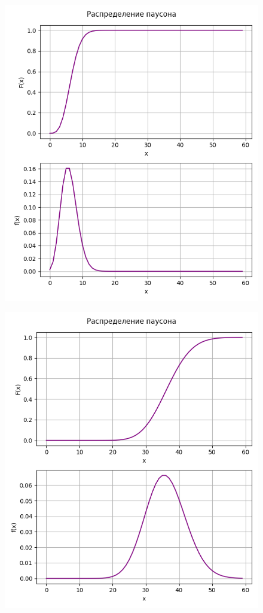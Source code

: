 \begin{figure}[H]
	\centering
	\includegraphics[width=0.7\linewidth]{src/3}
	\caption{}
	\label{fig:3}
\end{figure}

\begin{figure}[H]
	\centering
	\includegraphics[width=0.7\linewidth]{src/4}
	\caption{}
	\label{fig:4}
\end{figure}

